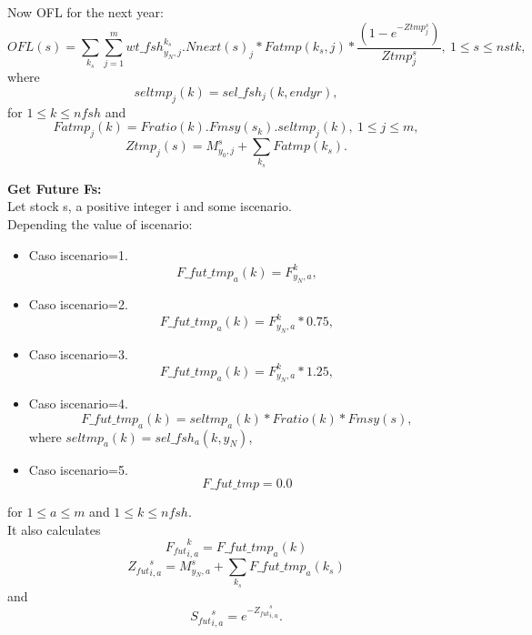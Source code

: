 \documentclass{article}
\begin{document}
Now OFL for the next year:
\begin{equation}
    OFL(s) =\sum_{k_s} \sum_{j=1}^mwt\_fsh^{k_s}_{y_N,j} . Nnext(s)_j * Fatmp(k_s,j) * \dfrac{(1 - e^{-Ztmp^s_j})}{Ztmp^s_j}, \ 1\leq s \leq nstk,
\end{equation}
where
\begin{equation}
    seltmp_j(k)=sel\_fsh_j(k,endyr),
\end{equation}
for $1\leq k \leq nfsh$ and
\begin{equation}
    Fatmp_j(k)=Fratio(k).Fmsy(s_k).seltmp_j(k), \  1\leq j \leq m,
\end{equation}
\begin{equation}
    Ztmp_j(s)=M^s_{y_0,j}+ \sum_{k_s}Fatmp(k_s).
\end{equation}

\textbf{Get Future Fs:}\\
Let stock s, a positive integer i and some iscenario.\\
Depending the value of iscenario:
\begin{itemize}
    \item Caso iscenario=1. \begin{equation}
        F\_fut\_tmp_a(k)=F^k_{y_N,a},
    \end{equation}
    \item Caso iscenario=2.  \begin{equation}
        F\_fut\_tmp_a(k) = F^k_{y_N,a}*0.75,
    \end{equation}
    \item Caso iscenario=3.  \begin{equation}
        F\_fut\_tmp_a(k) = F^{k}_{y_N,a}*1.25,
    \end{equation}
    \item Caso iscenario=4.
    \begin{equation}
        F\_fut\_tmp_a(k)=seltmp_a(k)*Fratio(k)*Fmsy(s),
    \end{equation}
    where $seltmp_a(k)=sel\_fsh_a(k,y_N)$,
    \item Caso iscenario=5.
    \begin{equation}
        F\_fut\_tmp = 0.0
    \end{equation}
\end{itemize}
for $1\leq a \leq m$ and  $1\leq k \leq nfsh$.\\
It also calculates
\begin{equation}
    {F_{fut}}^k_{i,a}   = F\_fut\_tmp_a(k)
\end{equation}
\begin{equation}
    {Z_{fut}}^s_{i,a}=M^s_{y_N,a}+\sum_{k_s}F\_fut\_tmp_a(k_s)
\end{equation}
and 
\begin{equation}
    {S_{fut}}^s_{i,a}=e^{-{Z_{fut}}^s_{i,a}}.
\end{equation}
\end{document}
